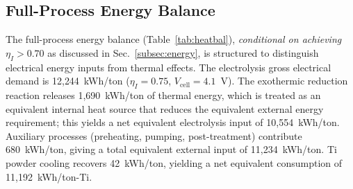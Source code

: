 \documentclass[sn-mathphys,Numbered]{sn-jnl}
\begin{document}
\subsection{Full-Process Energy Balance}
\label{subsec:heatbal}

The full-process energy balance (Table~\ref{tab:heatbal}), \emph{conditional on achieving $\eta_I > 0.70$} as discussed in Sec.~\ref{subsec:energy}, is structured to distinguish electrical energy inputs from thermal effects. The electrolysis gross electrical demand is 12{,}244~kWh/ton ($\eta_I=0.75$, $V_{\mathrm{cell}}=4.1$~V). The exothermic reduction reaction releases 1{,}690~kWh/ton of thermal energy, which is treated as an equivalent internal heat source that reduces the equivalent external energy requirement; this yields a net equivalent electrolysis input of 10{,}554~kWh/ton. Auxiliary processes (preheating, pumping, post-treatment) contribute 680~kWh/ton, giving a total equivalent external input of 11{,}234~kWh/ton. Ti powder cooling recovers 42~kWh/ton, yielding a net equivalent consumption of 11{,}192~kWh/ton-Ti.
\end{document}
